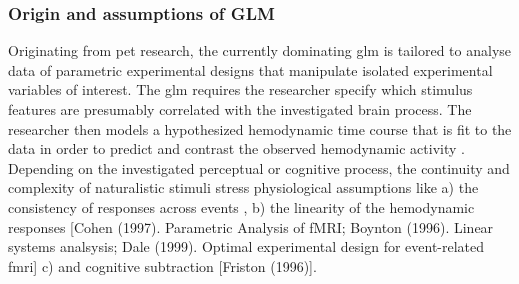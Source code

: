\subsubsection{Origin and assumptions of GLM}


%
Originating from \ac{pet} research, the currently dominating \ac{glm} is
tailored to analyse data of parametric experimental designs that
manipulate isolated experimental variables of interest.
%
The \ac{glm} requires the researcher specify which stimulus features are
presumably correlated with the investigated brain process.
%
The researcher then models a hypothesized hemodynamic time course that is fit to
the data in order to predict and contrast the observed hemodynamic activity
\citep{friston1998event}.
%
Depending on the investigated perceptual or cognitive process, the continuity
and complexity of naturalistic stimuli stress physiological assumptions like
%
a) the consistency of responses across events \citep[the basis for
\textit{trial-averaging};][]{dale1997selective},
%
b) the linearity of the hemodynamic responses [Cohen (1997). Parametric Analysis
of fMRI; Boynton (1996). Linear systems analsysis; Dale (1999). Optimal
experimental design for event-related fmri]%
c) and cognitive subtraction [Friston (1996)].


